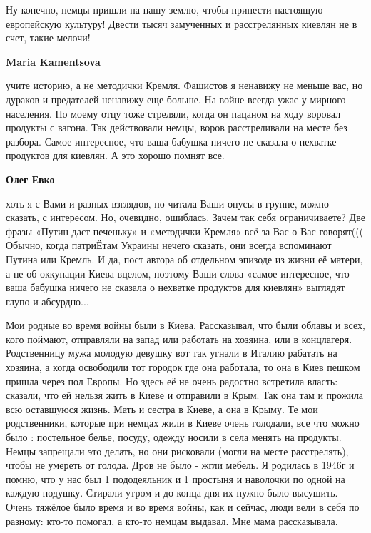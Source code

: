 \begin{itemize}
\begin{itemize}
Ну конечно, немцы пришли на нашу землю, чтобы принести настоящую европейскую
культуру! Двести тысяч замученных и расстрелянных киевлян не в счет, такие
мелочи!

\textbf{Maria Kamentsova} 

учите историю, а не методички Кремля. Фашистов я ненавижу не меньше вас, но
дураков и предателей ненавижу еще больше. На войне всегда ужас у мирного
населения. По моему отцу тоже стреляли, когда он пацаном на ходу воровал
продукты с вагона. Так действовали немцы, воров расстреливали на месте без
разбора. Самое интересное, что ваша бабушка ничего не сказала о нехватке
продуктов для киевлян. А это хорошо помнят все.

\textbf{Олег Евко} 

хоть я с Вами и разных взглядов, но читала Ваши опусы в группе, можно сказать,
с интересом. Но, очевидно, ошиблась. Зачем так себя ограничиваете? Две фразы
«Путин даст печеньку» и «методички Кремля» всё за Вас о Вас говорят((( Обычно,
когда патриЁтам Украины нечего сказать, они всегда вспоминают Путина или
Кремль. И да, пост автора об отдельном эпизоде из жизни её матери, а не об
оккупации Киева вцелом, поэтому Ваши слова «самое интересное, что ваша бабушка
ничего не сказала о нехватке продуктов для киевлян» выглядят глупо и
абсурдно...

\end{itemize} %


Мои родные во время войны были в Киева. Рассказывал, что были облавы и всех,
кого поймают, отправляли на запад или работать на хозяина, или в концлагеря.
Родственницу мужа молодую девушку вот так угнали в Италию рабатать на хозяина,
а когда освободили тот городок где она работала, то она в Киев пешком пришла
через пол Европы. Но здесь её не очень радостно встретила власть: сказали, что
ей нельзя жить в Киеве и отправили в Крым. Так она там и прожила всю оставшуюся
жизнь. Мать и сестра в Киеве, а она в Крыму. Те мои родственники, которые при
немцах жили в Киеве очень голодали, все что можно было : постельное белье,
посуду, одежду носили в села менять на продукты. Немцы запрещали это делать, но
они рисковали (могли на месте расстрелять), чтобы не умереть от голода. Дров не
было - жгли мебель. Я родилась в 1946г и помню, что у нас был 1 пододеяльник и
1 простыня и наволочки по одной на каждую подушку. Стирали утром и до конца дня
их нужно было высушить. Очень тяжёлое было время и во время войны, как и
сейчас, люди вели в себя по разному: кто-то помогал, а кто-то немцам выдавал.
Мне мама рассказывала.


\end{itemize}
